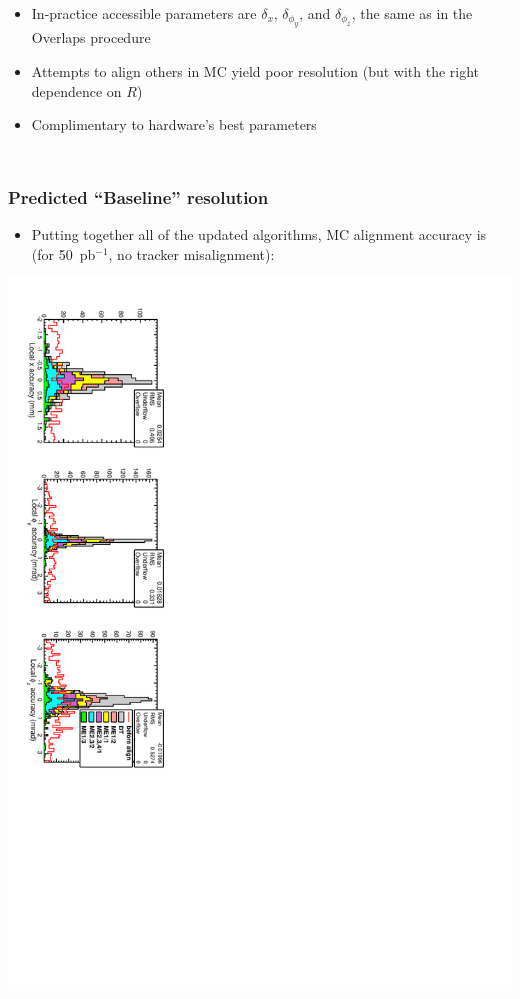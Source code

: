 \documentclass[compress]{beamer}
\begin{document}
\begin{frame}
\begin{columns}
\vspace{-0.5 cm}
\begin{itemize}
\item In-practice accessible parameters are $\delta_x$, $\delta_{\phi_y}$, and $\delta_{\phi_z}$, the same as in the Overlaps procedure
\item Attempts to align others in MC yield poor resolution {\scriptsize (but with the right dependence on $R$)}
\item Complimentary to hardware's best parameters
\end{itemize}
\end{columns}
\end{frame}

\begin{frame}
\frametitle{Predicted ``Baseline'' resolution}
\begin{itemize}
\item Putting together all of the updated algorithms, MC alignment accuracy is (for 50~pb$^{-1}$, no tracker misalignment):
\end{itemize}

\includegraphics[height=\linewidth, angle=90]{mc_cscresolution.pdf}


\end{frame}
\end{document}
